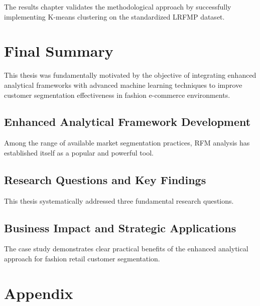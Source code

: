 \documentclass[12pt, a4paper, oneside]{report}
\begin{document}
The results chapter validates the methodological approach by successfully implementing K-means clustering on the standardized LRFMP dataset.


\chapter{Final Summary}

This thesis was fundamentally motivated by the objective of integrating enhanced analytical frameworks with advanced machine learning techniques to improve customer segmentation effectiveness in fashion e-commerce environments.


\section{Enhanced Analytical Framework Development}

Among the range of available market segmentation practices, RFM analysis has established itself as a popular and powerful tool.


\section{Research Questions and Key Findings}

This thesis systematically addressed three fundamental research questions.


\section{Business Impact and Strategic Applications}

The case study demonstrates clear practical benefits of the enhanced analytical approach for fashion retail customer segmentation.


\newpage
{}
\printbibliography[title={List of Literature}]


\appendix
\chapter{Appendix}
\end{document}
